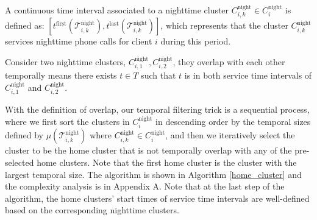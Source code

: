 \begin{definition}
A continuous time interval associated to a nighttime cluster $C^{\text{night}}_{i, k} \in C^{\text{night}}_i$ is defined as: $[t^{\text{first}}(\mathcal{T}^{\text{night}}_{i, k}), t^{\text{last}}(\mathcal{T}^{\text{night}}_{i, k})]$, which represents that the cluster $C^{\text{night}}_{i, k}$ services nighttime phone calls for client $i$ during this period.
\end{definition}

\begin{definition}
Consider two nighttime clusters, $C^{\text{night}}_{i, 1}, C^{\text{night}}_{i, 2}$, they overlap with each other temporally means there exists $t \in T$ such that $t$ is in both service time intervals of $C^{\text{night}}_{i, 1}$ and $C^{\text{night}}_{i, 2}$.
\end{definition}

With the definition of overlap, our temporal filtering trick is a sequential process, where we first sort the clusters in $C^{\text{night}}_i$ in descending order by the temporal sizes defined by $\mu(\mathcal{T}^{\text{night}}_{i, k})$ where $C^{\text{night}}_{i, k} \in C^{\text{night}}_i$, and then we iteratively select the cluster to be the home cluster that is not temporally overlap with any of the pre-selected home clusters. Note that the first home cluster is the cluster with the largest temporal size. The algorithm is shown in Algorithm \ref{home_cluster} and the complexity analysis is in Appendix A. Note that at the last step of the algorithm, the home clusters' start times of service time intervals are well-defined based on the corresponding nighttime clusters.

